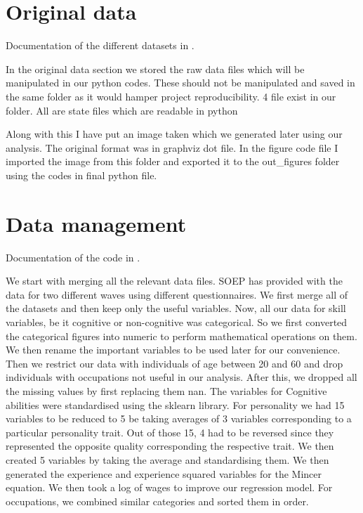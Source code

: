 \documentclass[a4paper,11pt,english]{sphinxmanual}
\begin{document}
\chapter{Original data}
\label{\detokenize{original_data:original-data}}\label{\detokenize{original_data:id1}}\label{\detokenize{original_data::doc}}
Documentation of the different datasets in .

In the original data section we stored the raw data files which will be manipulated in our python codes. These should not be manipulated and saved in the same folder as it would hamper project reproducibility.
4 file exist in our folder. All are state files which are readable in python

Along with this I have put an image taken which we generated later using our analysis. The original format was in graphviz dot file. In the figure code file I imported the image from this folder and exported it to the out\_figures folder using the codes in final python file.


\chapter{Data management}
\label{\detokenize{data_management:data-management}}\label{\detokenize{data_management:id1}}\label{\detokenize{data_management::doc}}
Documentation of the code in .

\label{\detokenize{data_management:module-src.data_management.get_skill_data}}
We start with merging all the relevant data files. SOEP has provided with the data for two different waves using different questionnaires. We first merge all of the datasets and then keep only the useful variables.
Now, all our data for skill variables, be it cognitive or non-cognitive was categorical. So we first converted the categorical figures into numeric to perform mathematical operations on them. We then rename the important variables to be used later for our convenience.
Then we restrict our data with individuals of age between 20 and 60 and drop individuals with occupations not useful in our analysis. After this, we dropped all the missing values by first replacing them nan.
The variables for Cognitive abilities were standardised using the sklearn library.
For personality we had 15 variables to be reduced to 5 be taking averages of 3 variables corresponding to a particular personality trait. Out of those 15, 4 had to be reversed since they represented the opposite quality corresponding the respective trait. We then created 5 variables by taking the average and standardising them.
We then generated the experience and experience squared variables for the Mincer equation.
We then took a log of wages to improve our regression model.
For occupations, we combined similar categories and sorted them in order.
\end{document}
